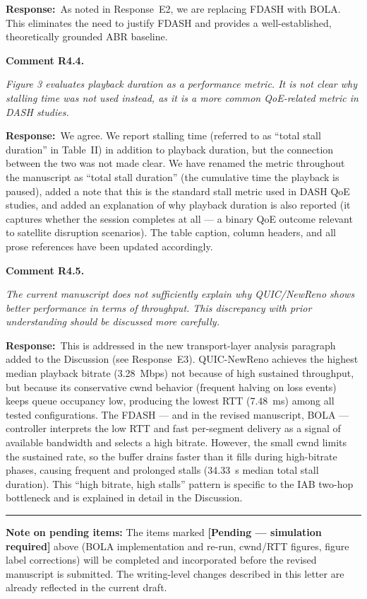 \documentclass[11pt]{article}
\newcommand{\comment}[2]{\vspace{0.8em}\noindent\textbf{Comment #1.}\begin{reviewbox}\textit{#2}\end{reviewbox}}
\newcommand{\response}{\noindent\textbf{Response:}~}
\begin{document}
\response As noted in Response~E2, we are replacing FDASH with BOLA. This eliminates the need to justify FDASH and provides a well-established, theoretically grounded ABR baseline.

\comment{R4.4}{Figure 3 evaluates playback duration as a performance metric. It is not clear why stalling time was not used instead, as it is a more common QoE-related metric in DASH studies.}

\response We agree. We report stalling time (referred to as ``total stall duration'' in Table~II) in addition to playback duration, but the connection between the two was not made clear. We have renamed the metric throughout the manuscript as ``total stall duration'' (the cumulative time the playback is paused), added a note that this is the standard stall metric used in DASH QoE studies, and added an explanation of why playback duration is also reported (it captures whether the session completes at all — a binary QoE outcome relevant to satellite disruption scenarios). The table caption, column headers, and all prose references have been updated accordingly.

\comment{R4.5}{The current manuscript does not sufficiently explain why QUIC/NewReno shows better performance in terms of throughput. This discrepancy with prior understanding should be discussed more carefully.}

\response This is addressed in the new transport-layer analysis paragraph added to the Discussion (see Response~E3). QUIC-NewReno achieves the highest median playback bitrate (3.28~Mbps) not because of high sustained throughput, but because its conservative cwnd behavior (frequent halving on loss events) keeps queue occupancy low, producing the lowest RTT (7.48~ms) among all tested configurations. The FDASH — and in the revised manuscript, BOLA — controller interprets the low RTT and fast per-segment delivery as a signal of available bandwidth and selects a high bitrate. However, the small cwnd limits the sustained rate, so the buffer drains faster than it fills during high-bitrate phases, causing frequent and prolonged stalls (34.33~s median total stall duration). This ``high bitrate, high stalls'' pattern is specific to the IAB two-hop bottleneck and is explained in detail in the Discussion.

\bigskip
\hrule
\bigskip

\noindent\textbf{Note on pending items:} The items marked \textcolor{red!70!black}{\textbf{[Pending — simulation required]}} above (BOLA implementation and re-run, cwnd/RTT figures, figure label corrections) will be completed and incorporated before the revised manuscript is submitted. The writing-level changes described in this letter are already reflected in the current draft.
\end{document}
